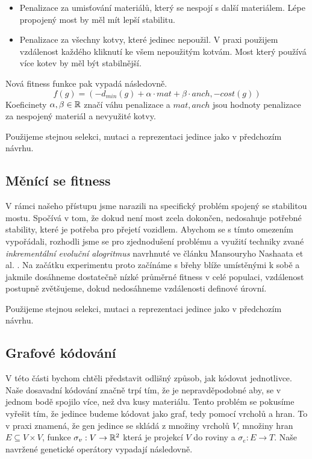 \begin{itemize}
    \item Penalizace za umisťování materiálů, který se nespojí s další materiálem. Lépe propojený most by měl mít lepší stabilitu.
    \item Penalizace za všechny kotvy, které jedinec nepoužil. V praxi použijem vzdálenost každého kliknutí ke všem nepoužitým kotvám. Most který používá více kotev by měl být stabilnější.
\end{itemize}

Nová fitness funkce pak vypadá následovně. $$f(g) = (-d_{min}(g) + \alpha \cdot mat + \beta \cdot anch, -cost(g))$$ Koeficinety $\alpha, \beta \in \mathbb{R}$ značí váhu penalizace a $mat, anch$ jsou hodnoty penalizace za nespojený materiál a nevyužité kotvy.

Použijeme stejnou selekci, mutaci a reprezentaci jedince jako v předchozím návrhu.

\subsection{Měnící se fitness}

V rámci našeho přístupu jsme narazili na specifický problém spojený se stabilitou mostu. Spočívá v tom, že dokud není most zcela dokončen, nedosahuje potřebné stability, které je potřeba pro přejetí vozidlem. Abychom se s tímto omezením vypořádali, rozhodli jsme se pro zjednodušení problému a využití techniky zvané \emph{inkrementální evoluční alogritmus} navrhnuté ve článku Mansouryho Nashaata et al. \cite{IGA}. Na začátku experimentu proto začínáme s břehy blíže umístěnými k sobě a jakmile dosáhneme dostatečně nízké průměrné fitness v celé populaci, vzdálenost postupně zvětšujeme, dokud nedosáhneme vzdálenosti definové úrovní. 

Použijeme stejnou selekci, mutaci a reprezentaci jedince jako v předchozím návrhu.

\subsection{Grafové kódování}

V této části bychom chtěli představit odlišný způsob, jak kódovat jednotlivce. Naše dosavadní kódování značně trpí tím, že je nepravděpodobné aby, se v jednom bodě spojilo více, než dva kusy materiálu. Tento problém se pokusíme vyřešit tím, že jedince budeme kódovat jako graf, tedy pomocí vrcholů a hran. To v praxi znamená, že gen jedince se skládá z množiny vrcholů $V$, množiny hran $E \subseteq V \times V$, funkce $\sigma_v : V \rightarrow \mathbb{R}^2$ která je projekcí $V$ do roviny a $\sigma_e : E \rightarrow T$. Naše navržené genetické operátory vypadají následovně.

